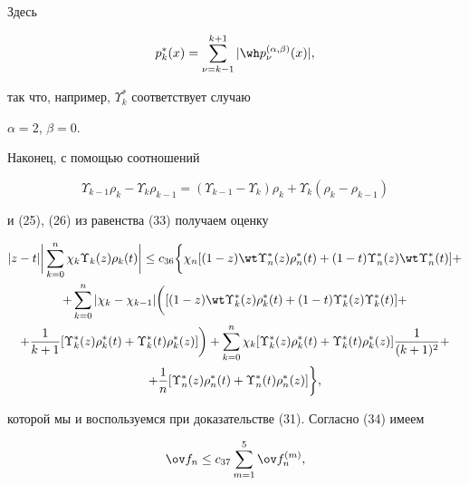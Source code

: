 Здесь


$$


p_k^*(x)=\sum_{\nu=k-1}^{k+1}|\wh p_{\nu}^{(\alpha,\beta)}(x)|,


$$


так что, например, $\Upsilon_k^*$ соответствует случаю


$\alpha=2$, $\beta=0$.





Наконец, с помощью соотношений


$$


\Upsilon_{k-1} \rho_k -\Upsilon_k \rho_{k-1}=


(\Upsilon_{k-1} -\Upsilon_k) \rho_k+\Upsilon_k (\rho_k - \rho_{k-1})


$$


и (25), (26) из равенства (33) получаем оценку


\begin{multline}


|z-t|\bigg|\sum_{k=0}^n\chi_k \Upsilon_k(z)\rho_k(t)\bigg|\le


c_{36}\bigg\{\chi_n [(1-z)\wt \Upsilon_n^* (z)\rho_n^*(t)+


(1-t)\Upsilon_n^*(z)\wt\Upsilon_n^*(t)]+ \\


%


+\sum_{k=0}^n |\chi_k-\chi_{k-1}|


\bigg([(1-z)\wt \Upsilon_k^* (z)\rho_k^*(t)+ (1-t) \Upsilon_k^* (z)


\Upsilon_k^* (t)]+ \\


%


+\frac{1}{k+1}[\Upsilon_k^* (z)\rho_k^*(t)


+\Upsilon_k^* (t)\rho_k^*(z)]\bigg )+


\sum_{k=0}^n \chi_k


[\Upsilon_k^* (z)\rho_k^*(t)+ \Upsilon_k^* (t)\rho_k^*(z)]


\frac{1}{(k+1)^2}+ \\


%


+\frac{1}{n}[\Upsilon_n^*(z)\rho_n^*(t)+\Upsilon_n^*(t)\rho_n^*(z)]\bigg\},


\end{multline}


которой мы и воспользуемся при доказательстве (31). Согласно (34) имеем


\begin{equation}


\ov f_n \le c_{37}\sum_{m=1}^5 \ov f_n^{(m)},


\end{equation}


